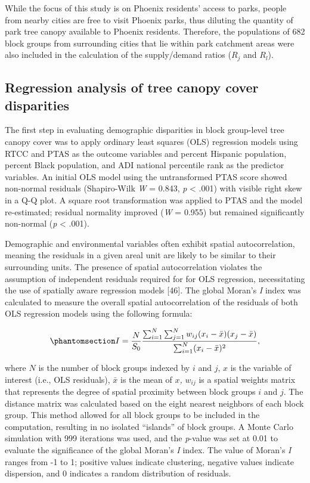 \documentclass[
  sn-basic,
]{sn-jnl}
\begin{document}
While the focus of this study is on Phoenix residents' access to parks,
people from nearby cities are free to visit Phoenix parks, thus diluting
the quantity of park tree canopy available to Phoenix residents.
Therefore, the populations of 682 block groups from surrounding cities
that lie within park catchment areas were also included in the
calculation of the supply/demand ratios (\(R_j\) and \(R_l\)).

\subsection{Regression analysis of tree canopy cover
disparities}\label{sec-methods-regress}

The first step in evaluating demographic disparities in block
group-level tree canopy cover was to apply ordinary least squares (OLS)
regression models using RTCC and PTAS as the outcome variables and
percent Hispanic population, percent Black population, and ADI national
percentile rank as the predictor variables. An initial OLS model using
the untransformed PTAS score showed non-normal residuals (Shapiro-Wilk
\emph{W} = 0.843, \emph{p} \textless{} .001) with visible right skew in
a Q-Q plot. A square root transformation was applied to PTAS and the
model re-estimated; residual normality improved (\emph{W} = 0.955) but
remained significantly non-normal (\emph{p} \textless{} .001).

Demographic and environmental variables often exhibit spatial
autocorrelation, meaning the residuals in a given areal unit are likely
to be similar to their surrounding units. The presence of spatial
autocorrelation violates the assumption of independent residuals
required for for OLS regression, necessitating the use of spatially
aware regression models {[}46{]}. The global Moran's \emph{I} index was
calculated to measure the overall spatial autocorrelation of the
residuals of both OLS regression models using the following formula:

\begin{equation}\protect\phantomsection\label{eq-morans}{I = \frac{N}{S_0} \frac {\sum_{i=1}^N \sum_{j=1}^N w_{ij}(x_i-\bar x) (x_j-\bar x)} {\sum_{i=1}^N (x_i-\bar x)^2},}\end{equation}

where \(N\) is the number of block groups indexed by \(i\) and \(j\),
\(x\) is the variable of interest (i.e., OLS residuals), \(\bar{x}\) is
the mean of \(x\)\emph{,} \(w_{ij}\) is a spatial weights matrix that
represents the degree of spatial proximity between block groups \(i\)
and \(j\). The distance matrix was calculated based on the eight nearest
neighbors of each block group. This method allowed for all block groups
to be included in the computation, resulting in no isolated ``islands''
of block groups. A Monte Carlo simulation with 999 iterations was used,
and the \emph{p}-value was set at 0.01 to evaluate the significance of
the global Moran's \emph{I} index. The value of Moran's \emph{I} ranges
from -1 to 1; positive values indicate clustering, negative values
indicate dispersion, and 0 indicates a random distribution of residuals.
\end{document}
